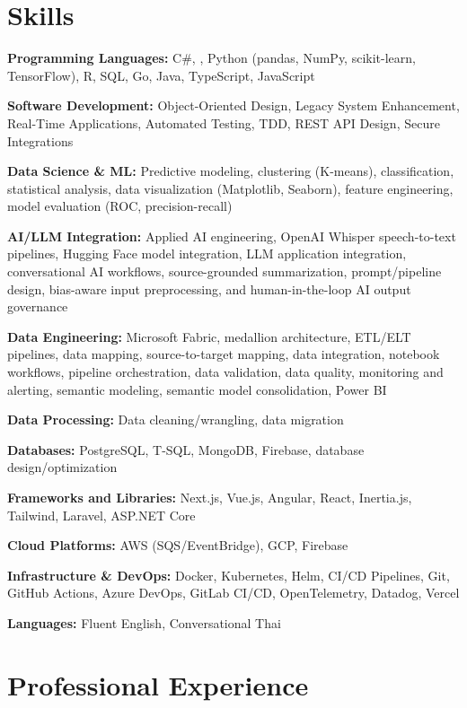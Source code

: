 \documentclass{../styles/cv}
\begin{document}
\section{Skills}
\resumesublistbegin
    \item \textbf{Programming Languages:} C\#, \cpp, Python (pandas, NumPy, scikit-learn, TensorFlow), R, SQL, Go, Java, TypeScript, JavaScript
    \item \textbf{Software Development:} Object-Oriented Design, Legacy System Enhancement, Real-Time Applications, Automated Testing, TDD, REST API Design, Secure Integrations
    \item \textbf{Data Science \& ML:} Predictive modeling, clustering (K-means), classification, statistical analysis, data visualization (Matplotlib, Seaborn), feature engineering, model evaluation (ROC, precision-recall)
    \item \textbf{AI/LLM Integration:} Applied AI engineering, OpenAI Whisper speech-to-text pipelines, Hugging Face model integration, LLM application integration, conversational AI workflows, source-grounded summarization, prompt/pipeline design, bias-aware input preprocessing, and human-in-the-loop AI output governance
    \item \textbf{Data Engineering:} Microsoft Fabric, medallion architecture, ETL/ELT pipelines, data mapping, source-to-target mapping, data integration, notebook workflows, pipeline orchestration, data validation, data quality, monitoring and alerting, semantic modeling, semantic model consolidation, Power BI
    \item \textbf{Data Processing:} Data cleaning/wrangling, data migration
    \item \textbf{Databases:} PostgreSQL, T-SQL, MongoDB, Firebase, database design/optimization
    \item \textbf{Frameworks and Libraries:} Next.js, Vue.js, Angular, React, Inertia.js, Tailwind, Laravel, ASP.NET Core
    \item \textbf{Cloud Platforms:} AWS (SQS/EventBridge), GCP, Firebase
    \item \textbf{Infrastructure \& DevOps:} Docker, Kubernetes, Helm, CI/CD Pipelines, Git, GitHub Actions, Azure DevOps, GitLab CI/CD, OpenTelemetry, Datadog, Vercel
    \item \textbf{Languages:} Fluent English, Conversational Thai
\resumesublistend

\section{Professional Experience}
\end{document}
